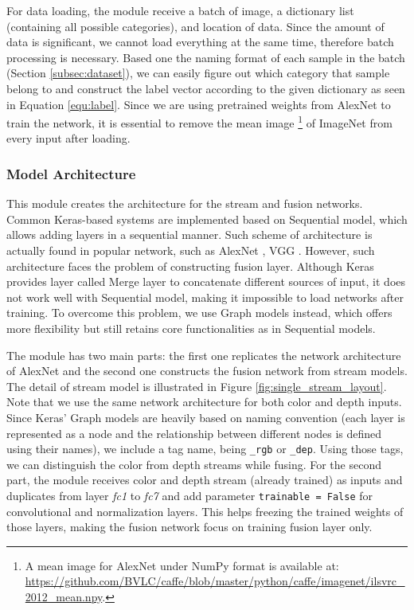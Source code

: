 For data loading, the module receive a batch of image, a dictionary list (containing all possible categories), and location of data. Since the amount of data is significant, we cannot load everything at the same time, therefore batch processing is necessary. Based one the naming format of each sample in the batch (Section \ref{subsec:dataset}), we can easily figure out which category that sample belong to and construct the label vector according to the given dictionary
as seen in Equation \ref{equ:label}. Since we are using pretrained weights from AlexNet to train the network, it is essential to remove the mean image \footnote{A mean image for AlexNet under NumPy format is available at: \url{https://github.com/BVLC/caffe/blob/master/python/caffe/imagenet/ilsvrc_2012_mean.npy}.} of ImageNet from every input after loading.

\subsubsection{Model Architecture}
This module creates the architecture for the stream and fusion networks. Common Keras-based systems are implemented based on Sequential model, which allows adding layers in a sequential manner. Such scheme of architecture is actually found in popular network, such as AlexNet \cite{Krizhevsky2012_alexnet}, VGG \cite{Simonyan2014_vgg}. However, such architecture faces the problem of constructing fusion layer. Although Keras provides layer called Merge layer to concatenate different sources of input, it does not work well with Sequential model, making it impossible to load networks after training. To overcome this problem, we use Graph models instead, which offers more flexibility but still retains core functionalities as in Sequential models.

The module has two main parts: the first one replicates the network architecture of AlexNet and the second one constructs the fusion network from stream models. The detail of stream model is illustrated in Figure \ref{fig:single_stream_layout}. Note that we use the same network architecture for both color and depth inputs. Since Keras' Graph models are heavily based on naming convention (each layer is represented as a node and the relationship between different nodes is defined using their names), we include a tag name, being \texttt{\_rgb} or \texttt{\_dep}. Using those tags, we can distinguish the color from depth streams while fusing. For the second part, the module receives color and depth stream (already trained) as inputs and duplicates from layer \textit{fc1} to \textit{fc7} and add parameter \texttt{trainable = False} for convolutional and normalization layers. This helps freezing the trained weights of those layers, making the fusion network focus on training fusion layer only.

